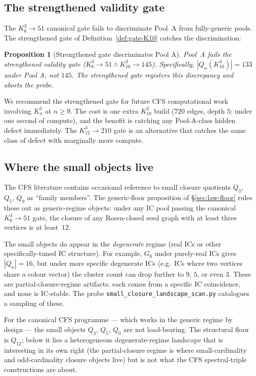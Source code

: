 \documentclass[12pt,a4paper]{article}
\newtheorem{proposition}[theorem]{Proposition}
\theoremstyle{definition}
\theoremstyle{remark}
\newcommand{\Kn}{K_n^3}
\newcommand{\Qn}{Q_n}
\begin{document}
\subsection{The strengthened validity gate}\label{sec:ic-gate}

The $K_6^3 \to 51$ canonical gate fails to discriminate Pool~A from
fully-generic pools. The strengthened gate of
Definition~\ref{def:gate-K10} catches the discrimination:

\begin{proposition}[Strengthened gate discriminates Pool A]
\label{prop:gate-discriminates}
Pool~A fails the strengthened validity gate
($K_6^3 \to 51 \wedge K_{10}^3 \to 145$).
Specifically, $|\Qn(K_{10}^3)| = 133$ under Pool A, not $145$. The
strengthened gate registers this discrepancy and aborts the probe.
\end{proposition}

We recommend the strengthened gate for future CFS computational work
involving $\Kn$ at $n \ge 9$. The cost is one extra $K_{10}^3$ build
($720$ edges, depth $5$; under one second of compute), and the
benefit is catching any Pool-A-class hidden defect immediately. The
$K_{12}^3 \to 210$ gate is an alternative that catches the same
class of defect with marginally more compute.

\subsection{Where the small objects live}\label{sec:ic-small}

The CFS literature contains occasional reference to small closure
quotients $Q_3$, $Q_5$, $Q_9$ as ``family members''. The
generic-floor proposition of \S\ref{sec:law-floor} rules these out
as generic-regime objects: under any IC pool passing the canonical
$K_6^3 \to 51$ gate, the closure of any Rosen-closed seed graph with
at least three vertices is at least~$12$.

The small objects do appear in the \emph{degenerate} regime (real ICs
or other specifically-tuned IC structure). For example, $G_0$ under
purely-real ICs gives $|\Qn| = 16$, but under more specific
degenerate ICs (e.g.\ ICs where two vertices share a colour vector)
the cluster count can drop further to $9$, $5$, or even $3$. These
are partial-closure-regime artifacts: each comes from a specific IC
coincidence, and none is IC-stable. The probe
\texttt{small\_closure\_landscape\_scan.py} catalogues a sampling of
these.

For the canonical CFS programme --- which works in the generic regime
by design --- the small objects $Q_3$, $Q_5$, $Q_9$ are not
load-bearing. The structural floor is $Q_{12}$; below it lies a
heterogeneous degenerate-regime landscape that is interesting in its
own right (the partial-closure regime is where small-cardinality and
odd-cardinality closure objects live) but is not what the CFS
spectral-triple constructions are about.
\end{document}
